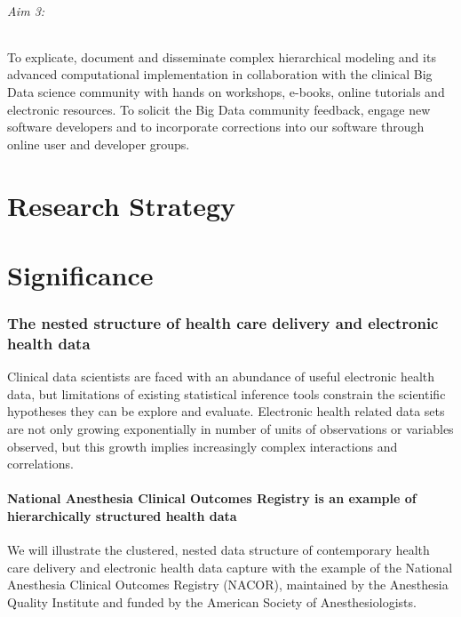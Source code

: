 \documentclass[11pt,notitlepage]{article}
\begin{document}
\paragraph*{Aim 3:} To explicate, document and disseminate complex hierarchical modeling and its advanced computational implementation in collaboration with the clinical Big Data science community with hands on workshops, e-books, online tutorials and electronic resources. To solicit the Big Data community feedback, engage new software developers and to incorporate corrections into our software through online user and developer groups.

\part*{Research Strategy}

\part*{Significance}

\section*{The nested structure of health care delivery and electronic health data}
Clinical data scientists are faced with an abundance of useful electronic health data, but limitations of existing statistical inference tools constrain the scientific hypotheses they can be explore and evaluate. Electronic health related data sets are not only growing exponentially in number of units of observations or variables observed, but this growth implies increasingly complex interactions and correlations.  

\subsection*{National Anesthesia Clinical Outcomes Registry is an example of hierarchically structured health data}
We will illustrate the clustered, nested data structure of contemporary health care delivery and electronic health data capture with the example of the National Anesthesia Clinical Outcomes Registry (NACOR), maintained by the Anesthesia Quality Institute and funded by the American Society of Anesthesiologists. 
\end{document}

